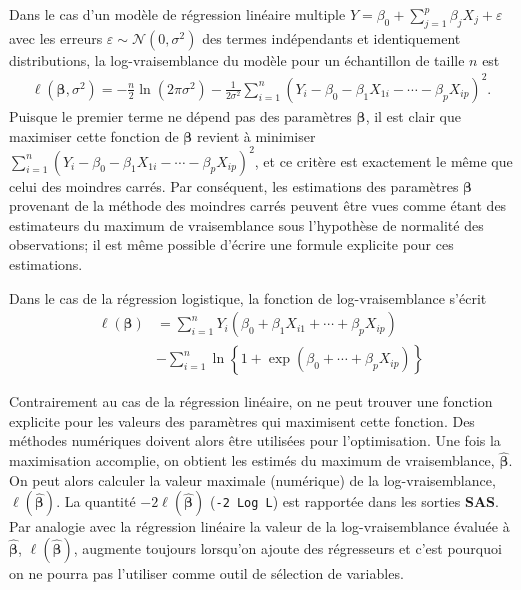 \documentclass[
  11pt,
  letterpaper,
]{book}
\theoremstyle{definition}
\theoremstyle{definition}
\theoremstyle{definition}
\theoremstyle{definition}
\theoremstyle{remark}
\begin{document}
Dans le cas d'un modèle de régression linéaire multiple \(Y = \beta_0 + \sum_{j=1}^p \beta_jX_j + \varepsilon\) avec les erreurs \(\varepsilon\sim \mathcal{N}(0, \sigma^2)\) des termes indépendants et identiquement distributions, la log-vraisemblance du modèle pour un échantillon de taille \(n\) est
\begin{align*}
 \ell(\boldsymbol{\beta}, \sigma^2) =- \frac{n}{2} \ln(2\pi\sigma^2) - \frac{1}{2\sigma^2}\sum_{i=1}^n (Y_i- \beta_0 - \beta_1 X_{1i} - \cdots - \beta_pX_{ip})^2.
\end{align*}
Puisque le premier terme ne dépend pas des paramètres \(\boldsymbol{\beta}\), il est clair que maximiser cette fonction de \(\boldsymbol{\beta}\) revient à minimiser \(\sum_{i=1}^n (Y_i- \beta_0 - \beta_1 X_{1i} - \cdots - \beta_pX_{ip})^2\), et ce critère est exactement le même que celui des moindres carrés. Par conséquent, les estimations des paramètres \(\boldsymbol{\beta}\) provenant de la méthode des moindres carrés peuvent être vues comme étant des estimateurs du maximum de vraisemblance sous l'hypothèse de normalité des observations; il est même possible d'écrire une formule explicite pour ces estimations.

Dans le cas de la régression logistique, la fonction de log-vraisemblance s'écrit
\begin{align*}
 \ell(\boldsymbol{\beta}) &= \sum_{i=1}^n Y_i ( \beta_0 + \beta_1 X_{i1} + \cdots + \beta_p X_{ip}) \\&- \sum_{i=1}^n \ln\left\{1+\exp(\beta_0 + \cdots + \beta_pX_{ip})\right\}
\end{align*}

Contrairement au cas de la régression linéaire, on ne peut trouver une fonction explicite pour les valeurs des paramètres qui maximisent cette fonction. Des méthodes numériques doivent alors être utilisées pour l'optimisation. Une fois la maximisation accomplie, on obtient les estimés du maximum de vraisemblance, \(\widehat{\boldsymbol{\beta}}\). On peut alors calculer la valeur maximale (numérique) de la log-vraisemblance, \(\ell(\widehat{\boldsymbol{\beta}})\). La quantité \(-2\ell(\widehat{\boldsymbol{\beta}})\) (\texttt{-2\ Log\ L}) est rapportée dans les sorties \textbf{SAS}. Par analogie avec la régression linéaire la valeur de la log-vraisemblance évaluée à \(\widehat{\boldsymbol{\beta}}\), \(\ell(\widehat{\boldsymbol{\beta}})\), augmente toujours lorsqu'on ajoute des régresseurs et c'est pourquoi on ne pourra pas l'utiliser comme outil de sélection de variables.
\end{document}

